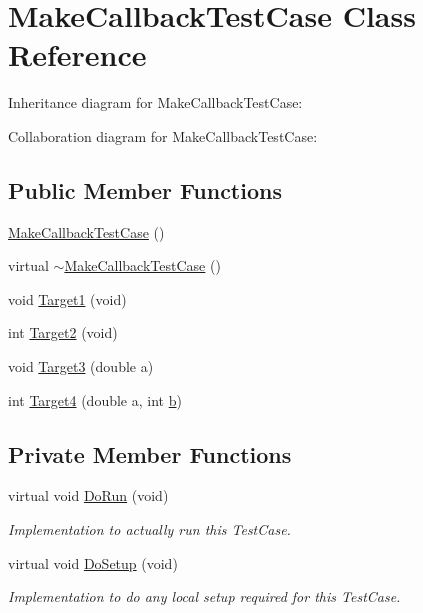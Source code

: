 \hypertarget{classMakeCallbackTestCase}{}\section{Make\+Callback\+Test\+Case Class Reference}
\label{classMakeCallbackTestCase}


Inheritance diagram for Make\+Callback\+Test\+Case\+:


Collaboration diagram for Make\+Callback\+Test\+Case\+:
\subsection*{Public Member Functions}
\begin{DoxyCompactItemize}
\item 
\hyperlink{classMakeCallbackTestCase_a2cd6e2285c7d1ba83b19f1e00743f140}{Make\+Callback\+Test\+Case} ()
\item 
virtual \hyperlink{classMakeCallbackTestCase_a1aef62340066c1bdc32927ecc4be91c7}{$\sim$\+Make\+Callback\+Test\+Case} ()
\item 
void \hyperlink{classMakeCallbackTestCase_aabac2514df85bd85e1dec5c2dbd89ffb}{Target1} (void)
\item 
int \hyperlink{classMakeCallbackTestCase_a8f3a0d047a67ec7347c7df8760bec8d9}{Target2} (void)
\item 
void \hyperlink{classMakeCallbackTestCase_af54380b176c6f0c91d4866bad7e8cab1}{Target3} (double a)
\item 
int \hyperlink{classMakeCallbackTestCase_a09bb705d58bb3ec1ea520eb1bbcedda2}{Target4} (double a, int \hyperlink{lte__pathloss_8m_a21ad0bd836b90d08f4cf640b4c298e7c}{b})
\end{DoxyCompactItemize}
\subsection*{Private Member Functions}
\begin{DoxyCompactItemize}
\item 
virtual void \hyperlink{classMakeCallbackTestCase_a6391f12ebdf57f1bc7c236997bdd8120}{Do\+Run} (void)
\begin{DoxyCompactList}\small\item\em Implementation to actually run this Test\+Case. \end{DoxyCompactList}\item 
virtual void \hyperlink{classMakeCallbackTestCase_af97656fe502b2e31e168489e2494575b}{Do\+Setup} (void)
\begin{DoxyCompactList}\small\item\em Implementation to do any local setup required for this Test\+Case. \end{DoxyCompactList}\end{DoxyCompactItemize}
